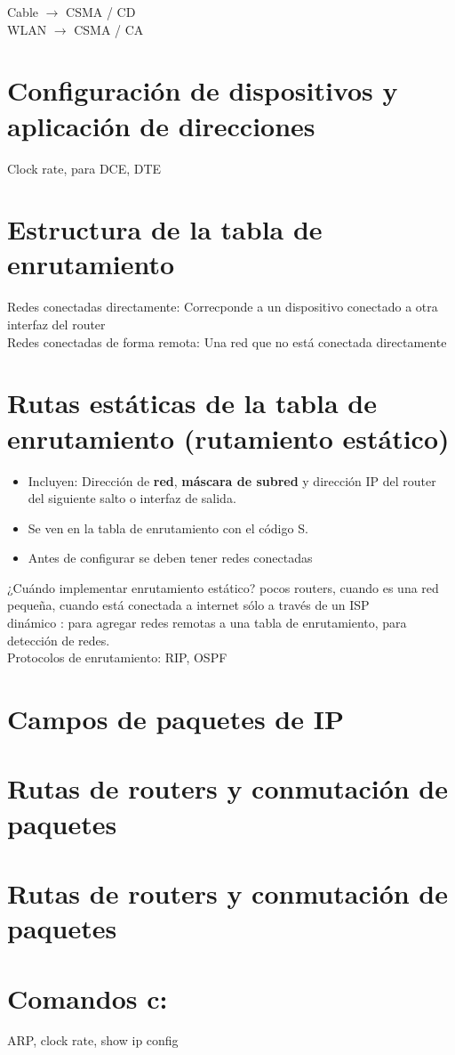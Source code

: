 \documentclass[letterpaper,12pt]{article}
\begin{document}
\begin{sloppypar}
Cable $\rightarrow$ CSMA / CD
\vspace{0.3cm}\\  
WLAN $\rightarrow$ CSMA / CA

\section{Configuración de dispositivos y aplicación de direcciones}
Clock rate, para DCE, DTE

\section{Estructura de la tabla de enrutamiento}
Redes conectadas directamente: Correcponde a un dispositivo conectado a otra interfaz del router
\vspace{0.3cm}\\ 
Redes conectadas de forma remota: Una red que no está conectada directamente 

\section{Rutas estáticas de la tabla de enrutamiento (rutamiento estático)}
\begin{itemize}
  \item Incluyen: Dirección de \textbf{red}, \textbf{máscara de subred} y dirección IP del router del siguiente salto o interfaz de salida.
  \item Se ven en la tabla de enrutamiento con el código S. 
  \item Antes de configurar se deben tener redes conectadas
\end{itemize}

¿Cuándo implementar enrutamiento estático? pocos routers, cuando es una red pequeña, cuando está conectada a internet sólo a través de un ISP
\vspace{0.3cm}\\ 
dinámico : para agregar redes remotas a una tabla de enrutamiento, para detección de redes.
\vspace{0.3cm}\\ 
Protocolos de enrutamiento: RIP, OSPF 

\section{Campos de paquetes de IP}
\section{Rutas de routers y conmutación de paquetes}
\section{Rutas de routers y conmutación de paquetes}
\section{Comandos c:}
ARP, clock rate, show ip config

\end{sloppypar}
\end{document}
